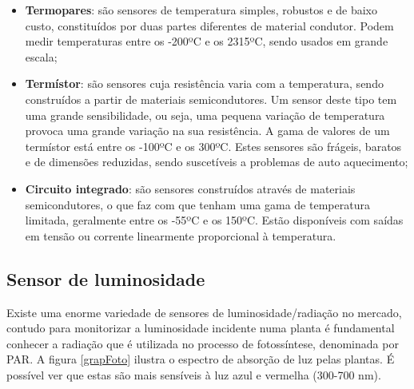 \begin{itemize}
	\item \textbf{Termopares}: são sensores de temperatura simples, robustos e de baixo custo, constituídos por duas partes diferentes de material condutor. Podem medir temperaturas entre os -200ºC e os 2315ºC, sendo usados em grande escala\cite{REOTEMPInstrumentCorporation}; 
	 
	\item \textbf{Termístor}: são sensores cuja resistência varia com a temperatura, sendo construídos a partir de materiais semicondutores. Um sensor deste tipo tem uma grande sensibilidade, ou seja, uma pequena variação de temperatura provoca uma grande variação na sua resistência. A gama de valores de um termístor está entre os -100ºC e os 300ºC. Estes sensores são frágeis, baratos e de dimensões reduzidas, sendo suscetíveis a problemas de auto aquecimento\cite{TemperatureSensors};

	\item \textbf{Circuito integrado}: são sensores construídos através de materiais semicondutores, o que faz com que tenham uma gama de temperatura limitada, geralmente entre os -55ºC e os 150ºC. 	Estão disponíveis com saídas em tensão ou corrente linearmente proporcional à temperatura. 

\end{itemize}


\subsection{Sensor de luminosidade }



Existe uma enorme variedade de sensores de luminosidade/radiação no mercado, contudo para monitorizar a luminosidade incidente numa planta é fundamental conhecer a radiação que é utilizada no processo de fotossíntese, denominada por \ac{PAR}. A figura \ref{grapFoto} ilustra o espectro de absorção de luz pelas plantas. É possível ver que estas são mais sensíveis à luz azul e vermelha (300-700 nm).

